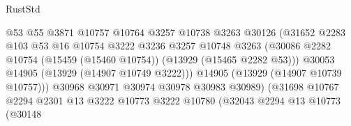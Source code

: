 \begin{lexlean}{RustStd}
\begin{coremodule}
                                            @53
                                            @55
                                            @3871
                                            @10757
                                            @10764
                                            @3257
                                            @10738
                                            @3263
                                            @30126
                                            (@31652
                                              @2283
                                              @103
                                              @53
                                              @16
                                              @10754
                                              @3222
                                              @3236
                                              @3257
                                              @10748
                                              @3263
                                              (@30086
                                                @2282
                                                @10754
                                                (@15459 (@15460 @10754))
                                                (@13929 (@15465 @2282 @53)))
                                              @30053
                                              @14905
                                              (@13929 (@14907 @10749 @3222)))
                                            @14905
                                            (@13929 (@14907 @10739 @10757)))
                                          @30968
                                          @30971
                                          @30974
                                          @30978
                                          @30983
                                          @30989)
                                        (@31698
                                          @10767
                                          @2294
                                          @2301
                                          @13
                                          @3222
                                          @10773
                                          @3222
                                          @10780
                                          (@32043
                                            @2294
                                            @13
                                            @10773
                                            (@30148

\end{coremodule}
\end{lexlean}
